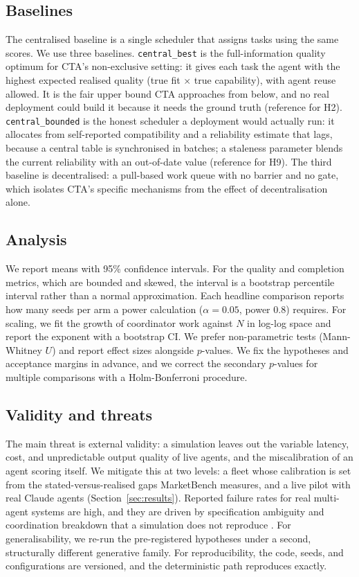 \documentclass[11pt]{article}
\newcommand{\code}[1]{\texttt{#1}}
\begin{document}
\subsection{Baselines}\label{sec:baseline}
The centralised baseline is a single scheduler that assigns tasks using the same scores. We use three baselines. \code{central\_best} is the full-information quality optimum for CTA's non-exclusive setting: it gives each task the agent with the highest expected realised quality (true fit $\times$ true capability), with agent reuse allowed. It is the fair upper bound CTA approaches from below, and no real deployment could build it because it needs the ground truth (reference for H2). \code{central\_bounded} is the honest scheduler a deployment would actually run: it allocates from self-reported compatibility and a reliability estimate that lags, because a central table is synchronised in batches; a staleness parameter blends the current reliability with an out-of-date value (reference for H9). The third baseline is decentralised: a pull-based work queue with no barrier and no gate, which isolates CTA's specific mechanisms from the effect of decentralisation alone.

\subsection{Analysis}
We report means with 95\% confidence intervals. For the quality and completion metrics, which are bounded and skewed, the interval is a bootstrap percentile interval rather than a normal approximation. Each headline comparison reports how many seeds per arm a power calculation ($\alpha=0.05$, power $0.8$) requires. For scaling, we fit the growth of coordinator work against $N$ in log-log space and report the exponent with a bootstrap CI. We prefer non-parametric tests (Mann-Whitney $U$) and report effect sizes alongside $p$-values. We fix the hypotheses and acceptance margins in advance, and we correct the secondary $p$-values for multiple comparisons with a Holm-Bonferroni procedure.

\subsection{Validity and threats}
The main threat is external validity: a simulation leaves out the variable latency, cost, and unpredictable output quality of live agents, and the miscalibration of an agent scoring itself. We mitigate this at two levels: a fleet whose calibration is set from the stated-versus-realised gaps MarketBench measures, and a live pilot with real Claude agents (Section~\ref{sec:results}). Reported failure rates for real multi-agent systems are high, and they are driven by specification ambiguity and coordination breakdown that a simulation does not reproduce \citep{cemri2025multiagent}. For generalisability, we re-run the pre-registered hypotheses under a second, structurally different generative family. For reproducibility, the code, seeds, and configurations are versioned, and the deterministic path reproduces exactly.
\end{document}
